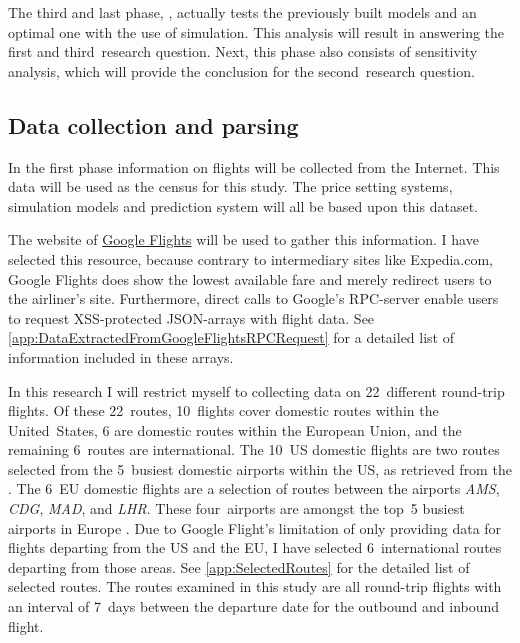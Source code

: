 The third and last phase, , actually tests the previously built models and an optimal one with the use of simulation. This analysis will result in answering the first and third~research question. Next, this phase also consists of sensitivity analysis, which will provide the conclusion for the second~research question.

\subsection{Data collection and parsing}
\label{subsec:DataCollectionAndParsing}
In the first phase information on flights will be collected from the Internet. This data will be used as the census for this study. The price setting systems, simulation models and prediction system will all be based upon this dataset.

The website of \href{http://google.nl/flights}{Google Flights} will be used to gather this information. I have selected this resource, because contrary to intermediary sites like Expedia.com, Google Flights does show the lowest available fare and merely redirect users to the airliner's site. Furthermore, direct calls to Google's RPC-server enable users to request XSS-protected JSON-arrays with flight data. See \autoref{app:DataExtractedFromGoogleFlightsRPCRequest} for a detailed list of information included in these arrays.

In this research I will restrict myself to collecting data on 22~different round-trip flights. Of these 22~routes, 10~flights cover domestic routes within the United~States, 6 are domestic routes within the European Union, and the remaining 6~routes are international. The 10~US domestic flights are two routes selected from the 5~busiest domestic airports within the US, as retrieved from the . The 6~EU domestic flights are a selection of routes between the airports \emph{AMS}, \emph{CDG}, \emph{MAD}, and \emph{LHR}. These four~airports are amongst the top~5 busiest airports in Europe . Due to Google Flight's limitation of only providing data for flights departing from the US and the EU, I have selected 6~international routes departing from those areas. See \autoref{app:SelectedRoutes} for the detailed list of selected routes. The routes examined in this study are all round-trip flights with an interval of 7~days between the departure date for the outbound and inbound flight.

